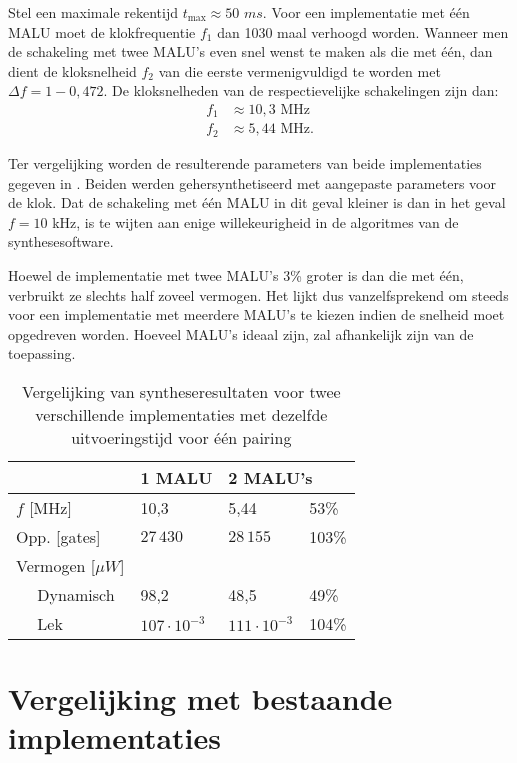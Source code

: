 Stel een maximale rekentijd $t_{\text{max}} \approx 50$ $ms$. Voor een implementatie met \'e\'en MALU moet de klokfrequentie $f_1$ dan 1030 maal verhoogd worden. Wanneer men de schakeling met twee MALU's even snel wenst te maken als die met \'e\'en, dan dient de kloksnelheid $f_2$ van die eerste vermenigvuldigd te worden met $\Delta f = 1 - 0,472$. De kloksnelheden van de respectievelijke schakelingen zijn dan:
\[\begin{aligned}
f_1	&\approx 10,3\text{ MHz}\\
f_2	&\approx 5,44\text{ MHz}.
\end{aligned}\]

Ter vergelijking worden de resulterende parameters van beide implementaties gegeven in . Beiden werden gehersynthetiseerd met aangepaste parameters voor de klok. Dat de schakeling met \'e\'en MALU in dit geval kleiner is dan in het geval $f = 10$ kHz, is te wijten aan enige willekeurigheid in de algoritmes van de synthesesoftware.

Hoewel de implementatie met twee MALU's 3\% groter is dan die met \'e\'en, verbruikt ze slechts half zoveel vermogen. Het lijkt dus vanzelfsprekend om steeds voor een implementatie met meerdere MALU's te kiezen indien de snelheid moet opgedreven worden. Hoeveel MALU's ideaal zijn, zal afhankelijk zijn van de toepassing.

\begin{table}[h]
	\caption{Vergelijking van syntheseresultaten voor twee verschillende implementaties met dezelfde uitvoeringstijd voor \'e\'en pairing}
	\label{tabel-resultaten-m1-vs-m2}

	\centering
	\begin{tabular}{lll@{$\;\;$}l}
		\toprule
		& 1 MALU	& \multicolumn{2}{l}{2 MALU's}\\
		\midrule
		$f$ [MHz]					& 10,3						& 5,44						& 53\% \\ 
		Opp. [gates]				& $27\,430$					& $28\,155$					& 103\% \\
		Vermogen [$\mu W$]		& 								& 								& \\
		$\quad$ Dynamisch			& 98,2						& 48,5						& 49\% \\
		$\quad$ Lek					& $107 \cdot 10^{-3}$	& $111 \cdot 10^{-3}$	& 104\% \\
		\bottomrule	
	\end{tabular}
\end{table}

\section{Vergelijking met bestaande implementaties}

